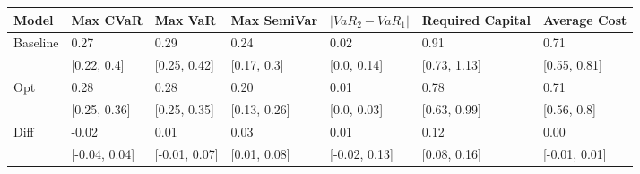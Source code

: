 \begin{tabular}{lllllll}
\toprule
   Model &      Max CVaR &       Max VaR &  Max SemiVar & $|VaR_2 - VaR_1|$ & Required Capital &  Average Cost \\
\midrule
Baseline &          0.27 &          0.29 &         0.24 &              0.02 &             0.91 &          0.71 \\
         &   [0.22, 0.4] &  [0.25, 0.42] &  [0.17, 0.3] &       [0.0, 0.14] &     [0.73, 1.13] &  [0.55, 0.81] \\
     Opt &          0.28 &          0.28 &         0.20 &              0.01 &             0.78 &          0.71 \\
         &  [0.25, 0.36] &  [0.25, 0.35] & [0.13, 0.26] &       [0.0, 0.03] &     [0.63, 0.99] &   [0.56, 0.8] \\
    Diff &         -0.02 &          0.01 &         0.03 &              0.01 &             0.12 &          0.00 \\
         & [-0.04, 0.04] & [-0.01, 0.07] & [0.01, 0.08] &     [-0.02, 0.13] &     [0.08, 0.16] & [-0.01, 0.01] \\
\bottomrule
\end{tabular}
